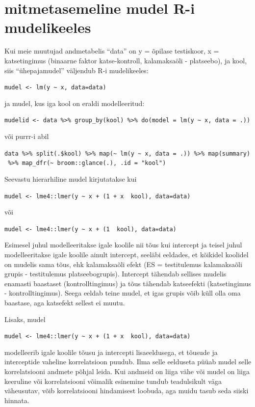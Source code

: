 \documentclass[]{book}
\begin{document}
\section{mitmetasemeline mudel R-i
mudelikeeles}\label{mitmetasemeline-mudel-r-i-mudelikeeles}

Kui meie muutujad andmetabelis ``data'' on y = õpilase testiskoor, x =
katsetingimus (binaarne faktor katse-kontroll, kalamaksaöli -
platseebo), ja kool, siis ``ühepajamudel'' väljendub R-i mudelikeeles:

\texttt{mudel\ \textless{}-\ lm(y\ \textasciitilde{}\ x,\ data=data)}

ja mudel, kus iga kool on eraldi modelleeritud:

\texttt{mudelid\ \textless{}-\ data\ \%\textgreater{}\%\ group\_by(kool)\ \%\textgreater{}\%\ do(model\ =\ lm(y\ \textasciitilde{}\ x,\ data\ =\ .))}

või purrr-i abil

\texttt{data\ \%\textgreater{}\%\ split(.\$kool)\ \%\textgreater{}\%\ map(\textasciitilde{}\ lm(y\ \textasciitilde{}\ x,\ data\ =\ .))\ \%\textgreater{}\%\ map(summary)\ \%\textgreater{}\%\ map\_dfr(\textasciitilde{}\ broom::glance(.),\ .id\ =\ "kool")}

Seevastu hierarhiline mudel kirjutatakse kui

\texttt{mudel\ \textless{}-\ lme4::lmer(y\ \textasciitilde{}\ x\ +\ (1\ +\ x\ \textbar{}\ kool),\ data=data)}

või

\texttt{mudel\ \textless{}-\ lme4::lmer(y\ \textasciitilde{}\ x\ +\ (1\ \textbar{}\ kool),\ data=data)}

Esimesel juhul modelleeritakse igale koolile nii tõus kui intercept ja
teisel juhul modelleeritakse igale koolile ainult intercept, seeläbi
eeldades, et kõikidel koolidel on mudelis sama tõus, ehk kalamaksaõli
efekt (ES = testitulemus kalamaksaõli grupis - testitulemus
platseebogrupis). Intercept tähendab sellises mudelis enamasti baastaset
(kontrolltingimus) ja tõus tähendab katseefekti (katsetingimus -
kontrolltingimus). Seega eeldab teine mudel, et igas grupis võib küll
olla oma baastase, aga katsefekt sellest ei muutu.

Lisaks, mudel

\texttt{mudel\ \textless{}-\ lme4::lmer(y\ \textasciitilde{}\ x\ +\ (1\ +\ x\ \textbar{}\textbar{}\ kool),\ data=data)}

modelleerib igale koolile tõusu ja intercepti lisaeeldusega, et tõusude
ja interceptide vaheline korrelatsioon puudub. Ilma selle eelduseta
püüab mudel selle korrelatsiooni andmete põhjal leida. Kui andmeid on
liiga vähe või mudel on liiga keeruline või korrelatsiooni võimalik
esinemine tundub teadulsikult väga väheusutav, võib korrelatsiooni
hindamisest loobuda, aga muidu tasub seda siiski hinnata.
\end{document}
